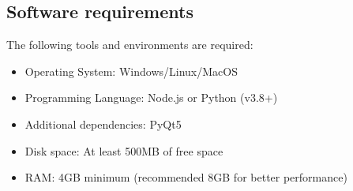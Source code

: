 \documentclass{article}
\begin{document}
\subsection{Software requirements}

The following tools and environments are required:

\begin{itemize}
    \item Operating System\@: Windows/Linux/MacOS
    \item Programming Language\@: Node.js or Python (v3.8+)
    \item Additional dependencies\@: PyQt5
    \item Disk space\@: At least 500MB of free space
    \item RAM\@: 4GB minimum (recommended 8GB for better performance)
\end{itemize}
\end{document}

